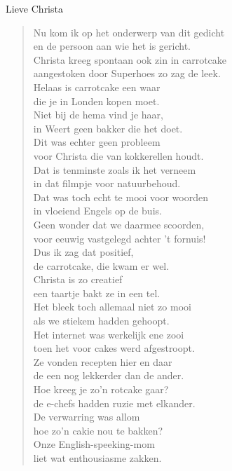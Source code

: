 \documentclass[12pt]{brief}
\begin{document}
\begin{letter}{Lieve Christa}
\begin{verse}
Nu kom ik op het onderwerp van dit gedicht\\
en de persoon aan wie het is gericht.\\
Christa kreeg spontaan ook zin in carrotcake\\
aangestoken door Superhoes zo zag de leek.\\[1.5em]

Helaas is carrotcake een waar\\
die je in Londen kopen moet.\\
Niet bij de hema vind je haar,\\
in Weert geen bakker die het doet.\\[1.5em]

Dit was echter geen probleem\\
voor Christa die van kokkerellen houdt.\\
Dat is tenminste zoals ik het verneem\\
in dat filmpje voor natuurbehoud.\\[1.5em]

Dat was toch echt te mooi voor woorden\\
in vloeiend Engels op de buis.\\
Geen wonder dat we daarmee scoorden,\\
voor eeuwig vastgelegd achter 't fornuis!\\[1.5em]

Dus ik zag dat positief,\\
de carrotcake, die kwam er wel.\\
Christa is zo creatief\\
een taartje bakt ze in een tel.\\[2.5em]

Het bleek toch allemaal niet zo mooi\\
als we stiekem hadden gehoopt.\\
Het internet was werkelijk ene zooi\\
toen het voor cakes werd afgestroopt.\\[1.5em]

Ze vonden recepten hier en daar\\
de een nog lekkerder dan de ander.\\
Hoe kreeg je zo'n rotcake gaar?\\
de e-chefs hadden ruzie met elkander.\\[1.5em]

De verwarring was allom\\
hoe zo'n cakie nou te bakken?\\
Onze English-speeking-mom\\
liet wat enthousiasme zakken.\\[1.5em]


\end{verse}
\end{letter}
\end{document}
